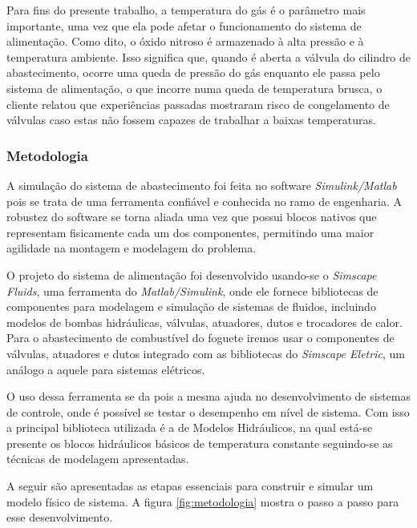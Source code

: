 \par Para fins do presente trabalho, a temperatura do gás é o parâmetro mais importante, uma vez que ela pode afetar o funcionamento do sistema de alimentação. Como dito, o óxido nitroso é armazenado à alta pressão e à temperatura ambiente. Isso significa que, quando é aberta a válvula do cilindro de abastecimento, ocorre uma queda de pressão do gás enquanto ele passa pelo sistema de alimentação, o que incorre numa queda de temperatura brusca, o cliente relatou que experiências passadas mostraram risco de congelamento de válvulas caso estas não fossem capazes de trabalhar a baixas temperaturas. 

\subsubsection{Metodologia}

\par A simulação do sistema de abastecimento foi feita no software \textit{Simulink/Matlab} pois se trata de uma ferramenta confiável e conhecida no ramo de engenharia. A robustez do software se torna aliada uma vez que possui blocos nativos que representam fisicamente cada um dos componentes, permitindo uma maior agilidade na montagem e modelagem do problema. 

\par O projeto do sistema de alimentação foi desenvolvido usando-se o \textit{Simscape Fluids}, uma ferramenta do \textit{Matlab/Simulink}, onde ele fornece bibliotecas de componentes para modelagem e simulação de sistemas de fluidos, incluindo modelos de bombas hidráulicas, válvulas, atuadores, dutos e trocadores de calor. Para o abastecimento de combustível do foguete iremos usar o componentes de válvulas, atuadores e dutos integrado com as bibliotecas do \textit{Simscape Eletric}, um análogo a aquele para sistemas elétricos. 

\par O uso dessa ferramenta se da pois a mesma ajuda no desenvolvimento de sistemas de controle, onde é possível se testar o desempenho em nível de sistema. Com isso a principal biblioteca utilizada é a de Modelos Hidráulicos, na qual está-se presente os blocos hidráulicos básicos de temperatura constante seguindo-se as técnicas de modelagem apresentadas.

\par A seguir são apresentadas as etapas essenciais para construir e simular um modelo físico de sistema. A figura \ref{fig:metodologia} mostra o passo a passo para esse desenvolvimento.


